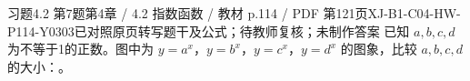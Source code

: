 \par\noindent\begin{minipage}{\linewidth}
\begin{bankitem}{习题4.2 第7题}{第4章 / 4.2 指数函数 / 教材 p.114 / PDF 第121页}{XJ-B1-C04-HW-P114-Y0303}{已对照原页转写题干及公式；待教师复核；未制作答案}
已知 $a,b,c,d$ 为不等于1的正数。图中为 $y=a^x$，$y=b^x$，$y=c^x$，$y=d^x$ 的图象，比较 $a,b,c,d$ 的大小：\blank。
\end{bankitem}
\end{minipage}\par\medskip
